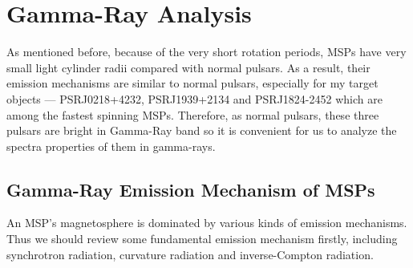 \documentclass[12pt]{report}
\newcommand{\mycaption}[1]{\caption{\textit{\footnotesize #1}}}
\begin{document}



  \chapter{Gamma-Ray Analysis}
      As mentioned before, because of the very short rotation periods, MSPs have very small light cylinder radii 
      compared with normal pulsars. As a result, their emission mechanisms are similar to normal pulsars, 
      especially for my target objects --- PSRJ0218+4232, PSRJ1939+2134 and PSRJ1824-2452
      which are among the fastest spinning MSPs. Therefore, as normal pulsars, these three 
      pulsars are bright in Gamma-Ray band so it is convenient for us to analyze the spectra 
      properties of them in gamma-rays.


      \section{Gamma-Ray Emission Mechanism of MSPs}
        An MSP's magnetosphere is dominated by various kinds of emission mechanisms. Thus we should review some 
        fundamental emission mechanism firstly, including synchrotron radiation, curvature radiation and 
        inverse-Compton radiation.
        
\end{document}
